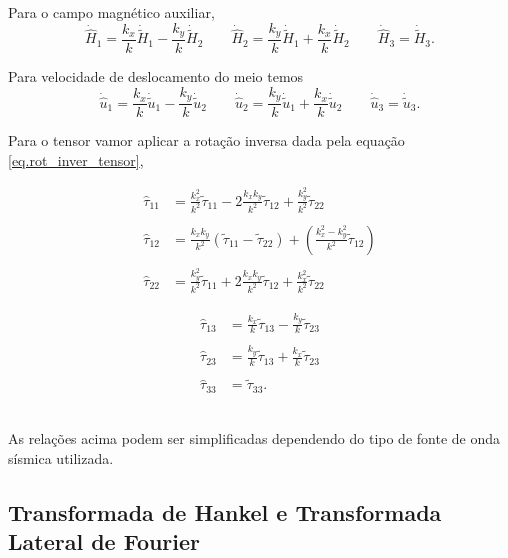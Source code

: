 Para o campo magn\'etico auxiliar,
\begin{equation*}
\dot{\hat{H}}_1=\frac{k_x}{k}\dot{\tilde{H}}_1-\frac{k_y}{k}\dot{\tilde{H}}_2\qquad
\dot{\hat{H}}_2=\frac{k_y}{k}\dot{\tilde{H}}_1+\frac{k_x}{k}\dot{\tilde{H}}_2\qquad
\dot{\hat{H}}_3=\dot{\tilde{H}}_3.
\end{equation*}


Para velocidade de deslocamento do meio temos
\begin{equation*}
\dot{\hat{u}}_1=\frac{k_x}{k}\dot{\tilde{u}}_1-\frac{k_y}{k}\dot{\tilde{u}}_2\qquad
\dot{\hat{u}}_2=\frac{k_y}{k}\dot{\tilde{u}}_1+\frac{k_x}{k}\dot{\tilde{u}}_2\qquad
\dot{\hat{u}}_3=\dot{\tilde{u}}_3.
\end{equation*}

Para o tensor vamor aplicar a rota\c{c}\~ao inversa dada pela equa\c{c}\~ao \ref{eq.rot_inver_tensor},\\
\begin{minipage}{.5\textwidth}
\begin{align*}
\hat{\tau}_{11}&=\frac{k_x^2}{k^2}\tilde{\tau}_{11}-2\frac{k_xk_y}{k^2}\tilde{\tau}_{12}+\frac{k_y^2}{k^2}\tilde{\tau}_{22}\\\\
\hat{\tau}_{12}&=\frac{k_xk_y}{k^2}(\tilde{\tau}_{11}-\tilde{\tau}_{22})+\left(\frac{k_x^2-k_y^2}{k^2}\tilde{\tau}_{12}\right)\\\\
\hat{\tau}_{22}&=\frac{k_y^2}{k^2}\tilde{\tau}_{11}+2\frac{k_xk_y}{k^2}\tilde{\tau}_{12}+\frac{k_x^2}{k^2}\tilde{\tau}_{22}
\end{align*}
\end{minipage}
\begin{minipage}{.5\textwidth}
\begin{align*}
\hat{\tau}_{13}&=\frac{k_x}{k}\tilde{\tau}_{13}-\frac{k_y}{k}\tilde{\tau}_{23}\\\\
\hat{\tau}_{23}&=\frac{k_y}{k}\tilde{\tau}_{13}+\frac{k_x}{k}\tilde{\tau}_{23}\\\\
\hat{\tau}_{33}&=\tilde{\tau}_{33}.
\end{align*}
\end{minipage}\\


As rela\c{c}\~oes acima podem ser simplificadas dependendo do tipo de fonte de onda s\'ismica utilizada.


\subsection{Transformada de Hankel e Transformada Lateral de Fourier}

